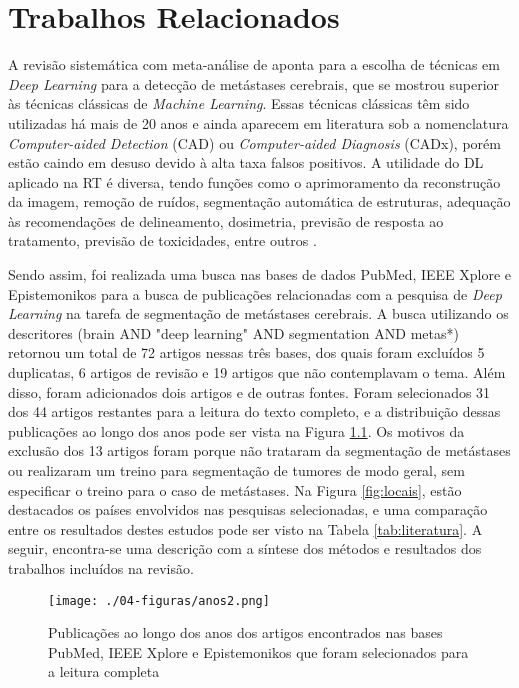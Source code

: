 %
\chapter{Trabalhos Relacionados}\label{relacionados}

A revisão sistemática com meta-análise de \cite{Cho:2020} aponta para a escolha de técnicas em \textit{Deep Learning} para a detecção de metástases cerebrais, que se mostrou superior às técnicas clássicas de \textit{Machine Learning}. Essas técnicas clássicas têm sido utilizadas há mais de 20 anos e ainda aparecem em literatura sob a nomenclatura \textit{Computer-aided Detection} (CAD) ou \textit{Computer-aided Diagnosis} (CADx), porém estão caindo em desuso devido à alta taxa falsos positivos. A utilidade do DL aplicado na RT é diversa, tendo funções como o aprimoramento da reconstrução da imagem, remoção de ruídos, segmentação automática de estruturas, adequação às recomendações de delineamento, dosimetria, previsão de resposta ao tratamento, previsão de toxicidades, entre outros \cite{Bibault:2021}. 

Sendo assim, foi realizada uma busca nas bases de dados PubMed, IEEE Xplore e Epistemonikos para a busca de publicações relacionadas com a pesquisa de \textit{Deep Learning} na tarefa de segmentação de metástases cerebrais. A busca utilizando os descritores (brain AND "deep learning" AND segmentation AND metas*) retornou um total de 72 artigos nessas três bases, dos quais foram excluídos 5 duplicatas, 6 artigos de revisão e 19 artigos que não contemplavam o tema. Além disso, foram adicionados dois artigos \cite{Hu:2019} e \cite{Rudie:2021} de outras fontes. Foram selecionados 31 dos 44 artigos restantes para a leitura do texto completo, e a distribuição dessas publicações ao longo dos anos pode ser vista na Figura \ref{fig:anos}. Os motivos da exclusão dos 13 artigos foram porque não trataram da segmentação de metástases ou realizaram um treino para segmentação de tumores de modo geral, sem especificar o treino para o caso de metástases. Na Figura \ref{fig:locais}, estão destacados os países envolvidos nas pesquisas selecionadas, e uma comparação entre os resultados destes estudos pode ser visto na Tabela \ref{tab:literatura}. A seguir, encontra-se uma descrição com a síntese dos métodos e resultados dos trabalhos incluídos na revisão.

\begin{figure}[!htb]
\centering
    \texttt{[image: ./04-figuras/anos2.png]}
	\caption{Publicações ao longo dos anos dos artigos encontrados nas bases PubMed, IEEE Xplore e Epistemonikos que foram selecionados para a leitura completa}\vspace{-0.2cm}
    \label{fig:anos}
\end{figure}

